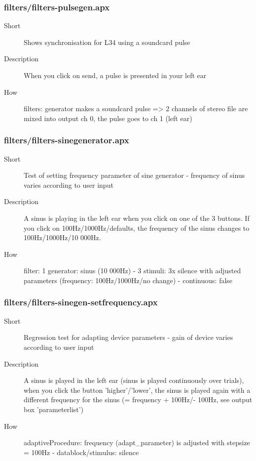 \subsubsection{filters/filters-pulsegen.apx}
\begin{description}
\item[Short] 
        Shows synchronisation for L34 using a soundcard pulse
\item[Description] 
 When you click on send, a pulse is presented in your left ear
\item[How] 
 filters: generator makes a soundcard pulse =\textgreater{} 2 channels of stereo file are mixed into output ch 0, the pulse goes to ch 1 (left ear)
\end{description}

\subsubsection{filters/filters-sinegenerator.apx}
\begin{description}
\item[Short] 
 Test of setting frequency parameter of sine generator - frequency of sinus varies according to user input
\item[Description] 
 A sinus is playing in the left ear when you click on one of the 3 buttons. If you click on 100Hz/1000Hz/defaults, the frequency of the sinus changes to 100Hz/1000Hz/10 000Hz.
\item[How] 
 filter: 1 generator: sinus (10 000Hz) - 3 stimuli: 3x silence with adjusted parameters (frequency: 100Hz/1000Hz/no change) -  continuous: false
\end{description}

\subsubsection{filters/filters-sinegen-setfrequency.apx}
\begin{description}
\item[Short] 
 Regression test for adapting device parameters - gain of device varies according to user input
\item[Description] 
 A sinus is played in the left ear (sinus is played continuously over trials), when you click the button 'higher'/'lower', the sinus is played again with a different frequency for the sinus (= frequency + 100Hz/- 100Hz, see output box 'parameterlist')
\item[How] 
 adaptiveProcedure: frequency (adapt\_parameter) is adjusted with stepsize = 100Hz - datablock/stimulus: silence
\end{description}

